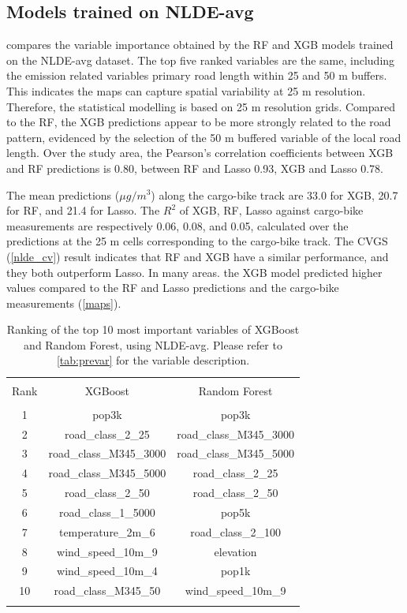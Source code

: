 \documentclass{article}
\begin{document}
\subsection{Models trained on NLDE-avg}

 compares the variable importance obtained by the RF and XGB models trained on the NLDE-avg dataset. The top five ranked variables are the same, including the emission related variables primary road length within 25 and 50 m buffers. This indicates the maps can capture spatial variability at 25 m resolution. Therefore, the statistical modelling is based on 25 m resolution grids. Compared to the RF, the XGB predictions appear to be more strongly related to the road pattern, evidenced by the selection of the 50 m buffered variable of the local road length. Over the study area, the Pearson's correlation coefficients between XGB and RF predictions is 0.80, between RF and Lasso 0.93, XGB and Lasso 0.78.

The mean predictions ($\mu g/m^3$) along the cargo-bike track are 33.0 for XGB, 20.7 for RF, and 21.4 for Lasso.  The $R^2$ of XGB, RF, Lasso against cargo-bike measurements are respectively 0.06, 0.08, and 0.05, calculated over the predictions at the 25 m cells corresponding to the cargo-bike track. The CVGS (\cref{nlde_cv}) result indicates that RF and XGB have a similar performance, and they both outperform Lasso. In many areas. the XGB model predicted higher values compared to the RF and Lasso predictions and the cargo-bike measurements (\cref{maps}). 
 
\begin{table}[H] \centering 
  \caption{Ranking of the top 10 most important variables of XGBoost and Random Forest, using NLDE-avg. Please refer to  \cref{tab:prevar} for the variable description.} 
    \label{nlde_vimp} 
\begin{tabular}{@{\extracolsep{5pt}} ccc} 
\\[-1.8ex]\hline 
\hline \\[-1.8ex] 
Rank & XGBoost & Random Forest \\ 
\hline \\[-1.8ex] 
1 & pop3k & pop3k \\ 
2 & road\_class\_2\_25 & road\_class\_M345\_3000 \\ 
3 & road\_class\_M345\_3000 & road\_class\_M345\_5000 \\ 
4 & road\_class\_M345\_5000 & road\_class\_2\_25 \\ 
5 & road\_class\_2\_50 & road\_class\_2\_50 \\ 
6 & road\_class\_1\_5000 & pop5k \\ 
7 & temperature\_2m\_6 & road\_class\_2\_100 \\ 
8 & wind\_speed\_10m\_9 & elevation \\ 
9 & wind\_speed\_10m\_4 & pop1k \\ 
10 & road\_class\_M345\_50 & wind\_speed\_10m\_9 \\ 
 
\hline \\[-1.8ex] 
\end{tabular} 
\end{table} 
\end{document}

